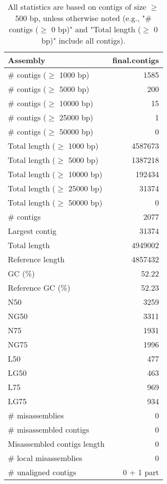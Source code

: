 \documentclass[12pt,a4paper]{article}
\begin{document}
\begin{table}[ht]
\begin{center}
\caption{All statistics are based on contigs of size $\geq$ 500 bp, unless otherwise noted (e.g., "\# contigs ($\geq$ 0 bp)" and "Total length ($\geq$ 0 bp)" include all contigs).}
\begin{tabular}{|l*{1}{|r}|}
\hline
Assembly & final.contigs \\ \hline
\# contigs ($\geq$ 1000 bp) & 1585 \\ \hline
\# contigs ($\geq$ 5000 bp) & 200 \\ \hline
\# contigs ($\geq$ 10000 bp) & 15 \\ \hline
\# contigs ($\geq$ 25000 bp) & 1 \\ \hline
\# contigs ($\geq$ 50000 bp) & 0 \\ \hline
Total length ($\geq$ 1000 bp) & 4587673 \\ \hline
Total length ($\geq$ 5000 bp) & 1387218 \\ \hline
Total length ($\geq$ 10000 bp) & 192434 \\ \hline
Total length ($\geq$ 25000 bp) & 31374 \\ \hline
Total length ($\geq$ 50000 bp) & 0 \\ \hline
\# contigs & 2077 \\ \hline
Largest contig & 31374 \\ \hline
Total length & 4949002 \\ \hline
Reference length & 4857432 \\ \hline
GC (\%) & 52.22 \\ \hline
Reference GC (\%) & 52.23 \\ \hline
N50 & 3259 \\ \hline
NG50 & 3311 \\ \hline
N75 & 1931 \\ \hline
NG75 & 1996 \\ \hline
L50 & 477 \\ \hline
LG50 & 463 \\ \hline
L75 & 969 \\ \hline
LG75 & 934 \\ \hline
\# misassemblies & 0 \\ \hline
\# misassembled contigs & 0 \\ \hline
Misassembled contigs length & 0 \\ \hline
\# local misassemblies & 0 \\ \hline
\# unaligned contigs & 0 + 1 part \\ \hline

\end{tabular}
\end{center}
\end{table}
\end{document}
